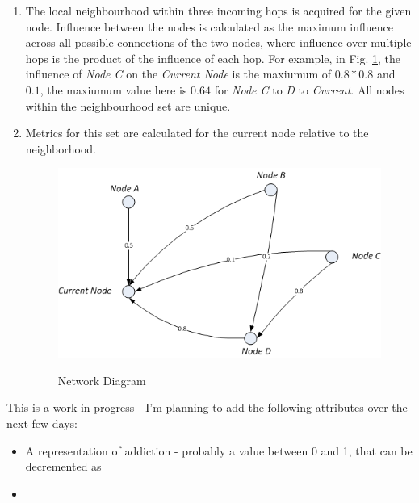 \documentclass[]{article}
\begin{document}
\begin{enumerate}
\item The local neighbourhood within three incoming hops is acquired for the given node. Influence between the nodes is calculated as the maximum influence across all possible connections of the two nodes, where influence over multiple hops is the product of the influence of each hop. For example, in Fig. \ref{networkdiag}, the influence of \emph{Node C} on the \emph{Current Node} is the maxiumum of $0.8 * 0.8$ and $0.1$, the maxiumum value here is $0.64$ for \emph{Node C} to \emph{D} to \emph{Current}. All nodes within the neighbourhood set are unique.
\item Metrics for this set are calculated for the current node relative to the neighborhood. 
\begin{figure}[h]
\begin{center}
\includegraphics{networkdiag.png}
\label{networkdiag}
\caption{Network Diagram}
\end{center}
\end{figure}
\end{enumerate}
This is a work in progress - I'm planning to add the following attributes over the next few days:
\begin{itemize}
\item A representation of addiction - probably a value between 0 and 1, that can be decremented as 
\item
\end{itemize}
\end{document}
